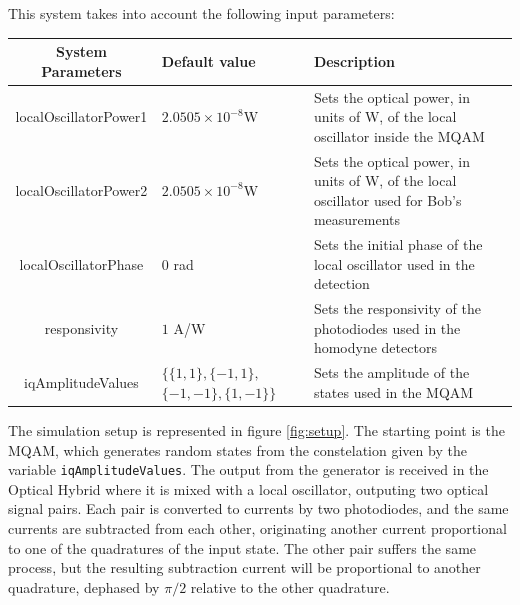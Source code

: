 %
\vspace{2em}
%
This system takes into account the following input parameters:
\begin{table}[H]
\centering
\begin{tabulary}{1.0\textwidth}{|c|p{30mm}|p{70mm}|}
\hline
\textbf{System Parameters}	& {\bf Default value}		& \textbf{Description}\\
\hline
localOscillatorPower1		& $2.0505 \times 10^{-8}$W	& Sets the optical power, in units of W, of the local oscillator inside the MQAM\\
\hline
localOscillatorPower2		& $2.0505 \times 10^{-8}$W	& Sets the optical power, in units of W, of the local oscillator used for Bob's measurements\\
\hline
localOscillatorPhase		& $0$ rad					& Sets the initial phase of the local oscillator used in the detection\\
\hline
responsivity				& $1$ A/W					& Sets the responsivity of the photodiodes used in the homodyne detectors\\
\hline
iqAmplitudeValues			& $\{ \{ 1, 1 \}, \{ -1, 1 \},$ $ \{ -1, -1 \}, \{ 1, -1 \} \}$
														& Sets the amplitude of the states used in the MQAM\\
%
%
\hline
\end{tabulary}
\end{table}
%
\vspace{2em}
%
The simulation setup is represented in figure \ref{fig:setup}. The starting point is the MQAM, which generates random states from the constelation given by the variable \texttt{iqAmplitudeValues}. The output from the generator is received in the Optical Hybrid where it is mixed with a local oscillator, outputing two optical signal pairs. Each pair is converted to currents by two photodiodes, and the same currents are subtracted from each other, originating another current proportional to one of the quadratures of the input state.
The other pair suffers the same process, but the resulting subtraction current will be proportional to another quadrature, dephased by $\pi/2$ relative to the other quadrature.\\

